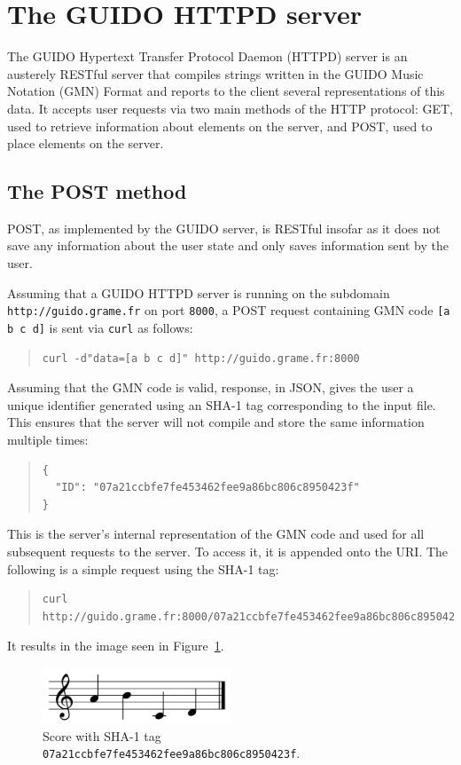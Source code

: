 \documentclass{article}
\begin{document}
\section{The GUIDO HTTPD server}
The GUIDO Hypertext Transfer Protocol Daemon (HTTPD) server is an austerely RESTful server that compiles strings written in the GUIDO Music Notation (GMN) Format and reports to the client several representations of this data.  It accepts user requests via two main methods of the HTTP protocol: GET, used to retrieve information about elements on the server, and POST, used to place elements on the server.
\subsection{The POST method}
POST, as implemented by the GUIDO server, is RESTful insofar as it does not save any information about the user state and only saves information sent by the user.\par
Assuming that a GUIDO HTTPD server is running on the subdomain \break \verb=http://guido.grame.fr= on port \verb=8000=, a POST request containing GMN code \verb=[a b c d]= is sent via \verb=curl= as follows:
\begin{quote}
\begin{verbatim}
curl -d"data=[a b c d]" http://guido.grame.fr:8000
\end{verbatim}
\end{quote}
Assuming that the GMN code is valid, response, in JSON, gives the user a unique identifier generated using an SHA-1 tag corresponding to the input file.  This ensures that the server will not compile and store the same information multiple times:
\begin{quote}
\begin{verbatim}
{
  "ID": "07a21ccbfe7fe453462fee9a86bc806c8950423f"
}
\end{verbatim}
\end{quote}
This is the server's internal representation of the GMN code and used for all subsequent requests to the server.  To access it, it is appended onto the URI.  The following is a simple request using the SHA-1 tag:
\begin{quote}
\begingroup
\fontsize{7.5pt}{12pt}\selectfont
\begin{verbatim}
curl http://guido.grame.fr:8000/07a21ccbfe7fe453462fee9a86bc806c8950423f
\end{verbatim}
\endgroup
\end{quote}
It results in the image seen in Figure~\ref{fig:figure1}.
\begin{figure}[h]
  \centering
    \includegraphics[width=0.5\textwidth]{figure1}
  \cprotect\caption{\label{fig:figure1}Score with SHA-1 tag \verb=07a21ccbfe7fe453462fee9a86bc806c8950423f=.}
\end{figure}
\end{document}

